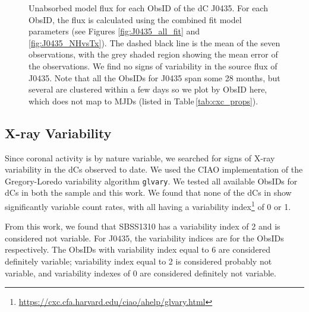 \documentclass[twocolumn, tighten, times, astrosymb]{aastex631}
\begin{document}
\begin{figure}
\centering
{}
\caption{Unabsorbed model flux for each ObsID of the dC J0435. For each ObsID, the flux is calculated using the combined fit model parameters (see Figures \ref{fig:J0435_all_fit} and \ref{fig:J0435_NHvsTx}). The dashed black line is the mean of the seven observations, with the grey shaded region showing the mean error of the observations. We find no signs of variability in the source flux of J0435. Note that all the ObsIDs for J0435 span some 28 months, but several are clustered within a few days so we plot by ObsID here, which does not map to MJDs (listed in Table\,\ref{tab:cxc_props}). }
\label{fig:J0435_flux_var}
\end{figure}



\subsection{X-ray Variability}\label{sec:xray_var}

Since coronal activity is by nature variable, we searched for signs of X-ray variability in the dCs observed to date. We used the CIAO implementation of the Gregory-Loredo variability algorithm \citep{Gregory1992} \texttt{glvary}. We tested all available ObsIDs for dCs in both the \citet{Green2019} sample and this work. We found that none of the dCs in \citet{Green2019} show significantly variable count rates, with all having a variability index\footnote{\url{https://cxc.cfa.harvard.edu/ciao/ahelp/glvary.html}} of 0 or 1.

From this work, we found that SBSS1310 has a variability index of 2 and is considered not variable. For J0435, the variability indices are  for the ObsIDs  respectively. The ObsIDs with variability index equal to 6 are considered definitely variable; variability index equal to 2 is considered probably not variable, and variability indexes of 0 are considered definitely not variable.
\end{document}
